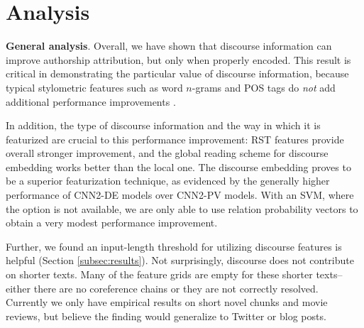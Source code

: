 \section{Analysis}
\label{sec:analysis}

\begin{table}
\begin{center}
\caption{Nearest neighbors of example embeddings with t-SNE clustering (top 5)}
\label{tab:tsne}
\end{center}
\end{table}

\textbf{General analysis}.
Overall, we have  shown that discourse information can improve authorship attribution, but only when properly encoded.
This result is critical in demonstrating the particular value of discourse information, because typical stylometric features such as word $n$-grams and POS tags do {\it not} add additional performance improvements \citep{Ruder:2016,Sari:2017}.

In addition, the type of discourse information and the way in which it is featurized are crucial to this performance improvement:
RST features provide overall stronger improvement, and the global reading scheme for discourse embedding works better than the local one.
The discourse embedding proves to be a superior featurization technique, as evidenced by the generally higher performance of CNN2-DE models over CNN2-PV models.
With an SVM, where the option is not available, we are only able to use relation probability vectors to obtain a very modest performance improvement. 

Further, we found an input-length threshold for utilizing discourse features is helpful (Section \ref{subsec:results}).
Not surprisingly, discourse does not contribute on shorter texts.
Many of the feature grids are empty for these shorter texts-- either there are no coreference chains or they are not correctly resolved. 
Currently we only have empirical results on short novel chunks and movie reviews, but believe the finding would generalize to Twitter or blog posts.
\medskip


